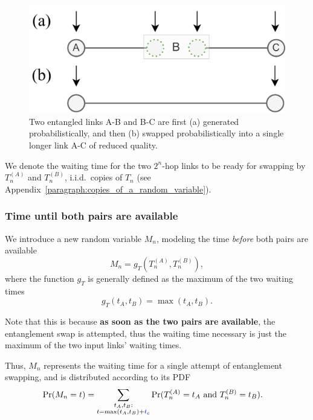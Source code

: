 \documentclass{masterthesis}
\begin{document}
\begin{figure}[ht]
    \centering
    \includegraphics[width=0.66\linewidth]{images/swap.png}
    \caption{Two entangled links A-B and B-C are first (a) generated probabilistically, and then (b) swapped probabilistically into a single longer link A-C of reduced quality.}\label{fig:entanglement_swapping}
\end{figure}

We denote the waiting time for the two $2^n$-hop links to be ready for swapping by $T_n^{(A)}$ and $T_n^{(B)}$, i.i.d.\ copies of $T_n$ (see Appendix~\ref{paragraph:copies_of_a_random_variable}).

\subsubsection*{Time until both pairs are available}

We introduce a new random variable $M_n$, modeling the time \textit{before} both pairs are available
\begin{equation}\label{eq:waiting_time_pair}
    M_n = g_T(T_n^{(A)} , T_n^{(B)}) ,
\end{equation}
where the function $g_T$ is generally defined as the maximum of the two waiting times
\begin{equation}\label{eq:waiting_time_pair_max}
    g_T(t_A, t_B) = \max(t_A, t_B) .
\end{equation}

Note that this is because \textbf{as soon as the two pairs are available}, the entanglement swap is attempted, thus the waiting time necessary is just the maximum of the two input links' waiting times.

Thus, $M_n$ represents the waiting time for a single attempt of entanglement swapping, and is distributed according to its PDF
\begin{align}\label{eq:pdf_waiting_time_pair}
    \Pr(M_n = t) &= \sum_{\substack{t_A, t_B: \\ t = \max(t_A, t_B) + \textcolor{blue}{t_c}}} \Pr(T_n^{(A)} = t_A \text{ and } T_n^{(B)} = t_B) .
\end{align}
\end{document}

